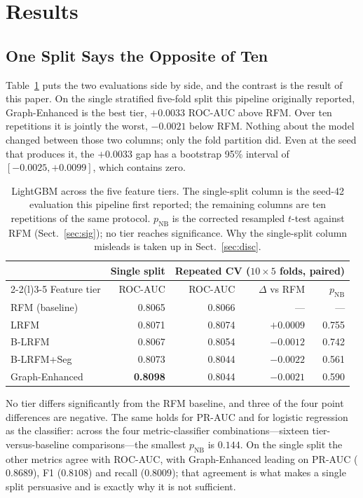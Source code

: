 \documentclass[runningheads]{llncs}
\begin{document}
\section{Results}
\label{sec:results}

\subsection{One Split Says the Opposite of Ten}

Table~\ref{tab:main} puts the two evaluations side by side, and the contrast is
the result of this paper. On the single stratified five-fold split this pipeline
originally reported, Graph-Enhanced is the best tier, $+0.0033$ ROC-AUC above
RFM. Over ten repetitions it is jointly the worst, $-0.0021$ below RFM. Nothing
about the model changed between those two columns; only the fold partition did. Even at the
seed that produces it, the $+0.0033$ gap has a bootstrap 95\% interval of
$[-0.0025, +0.0099]$, which contains zero.

\begin{table}[t]
\centering
\caption{LightGBM across the five feature tiers. The single-split column is the
seed-42 evaluation this pipeline first reported; the remaining columns are ten
repetitions of the same protocol. $p_{\mathrm{NB}}$ is the corrected resampled
$t$-test against RFM (Sect.~\ref{sec:sig}); no tier reaches significance.
Why the single-split column misleads is taken up in Sect.~\ref{sec:disc}.}
\label{tab:main}
\setlength{\tabcolsep}{9pt}
\begin{tabular}{lrrrr}
\toprule
 & Single split & \multicolumn{3}{c}{Repeated CV ($10 \times 5$ folds, paired)} \\
\cmidrule(lr){2-2}\cmidrule(l){3-5}
Feature tier & ROC-AUC & ROC-AUC & $\Delta$ vs RFM & $p_{\mathrm{NB}}$ \\
\midrule
RFM (baseline) & 0.8065 & 0.8066 & --- & --- \\
LRFM & 0.8071 & 0.8074 & $+0.0009$ & 0.755 \\
B-LRFM & 0.8067 & 0.8054 & $-0.0012$ & 0.742 \\
B-LRFM+Seg & 0.8073 & 0.8044 & $-0.0022$ & 0.561 \\
Graph-Enhanced & \textbf{0.8098} & 0.8044 & $-0.0021$ & 0.590 \\
\bottomrule
\end{tabular}
\end{table}

No tier differs significantly from the RFM baseline, and three of the four point
differences are negative. The same holds for PR-AUC and for logistic regression
as the classifier: across the four metric-classifier combinations---sixteen
tier-versus-baseline comparisons---the smallest $p_{\mathrm{NB}}$ is $0.144$. On
the single split the other metrics agree with ROC-AUC, with Graph-Enhanced
leading on PR-AUC ($0.8689$), F1 ($0.8108$) and recall ($0.8009$); that agreement
is what makes a single split persuasive and is exactly why it is not sufficient.
\end{document}

